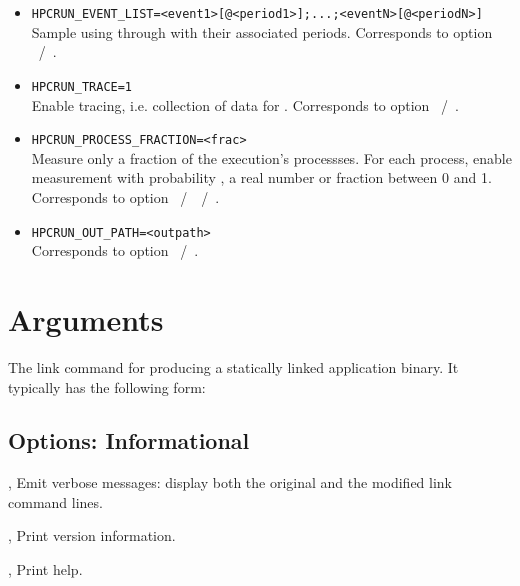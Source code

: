 \documentclass[english]{article}
\begin{document}
\begin{itemize}
\item \verb+HPCRUN_EVENT_LIST=<event1>[@<period1>];...;<eventN>[@<periodN>]+\\
  Sample using  through  with their associated periods.
  Corresponds to  option ~/~.

\item \verb+HPCRUN_TRACE=1+\\
  Enable tracing, i.e. collection of data for .
  Corresponds to  option ~/~.

\item \verb+HPCRUN_PROCESS_FRACTION=<frac>+\\
  Measure only a fraction  of the execution's processses.
  For each process, enable measurement with probability ,
  a real number or fraction between 0 and 1.
  Corresponds to  option ~/~~/~.

\item \verb+HPCRUN_OUT_PATH=<outpath>+\\
  Corresponds to  option ~/~.

\end{itemize}




\section{Arguments}

\begin{Description}
\item[\Arg{link-command}] The link command for producing a statically linked application binary.
It typically has the following form:\\
\SP\SP\SP {}   
\end{Description}


\subsection{Options: Informational}

\begin{Description}

\item[\Opt{-v}, \Opt{--verbose}]
Emit verbose messages: display both the original and the modified link command lines.

\item[\Opt{-V}, \Opt{--version}]
Print version information.

\item[\Opt{-h}, \Opt{--help}]
Print help.

\end{Description}
\end{document}
